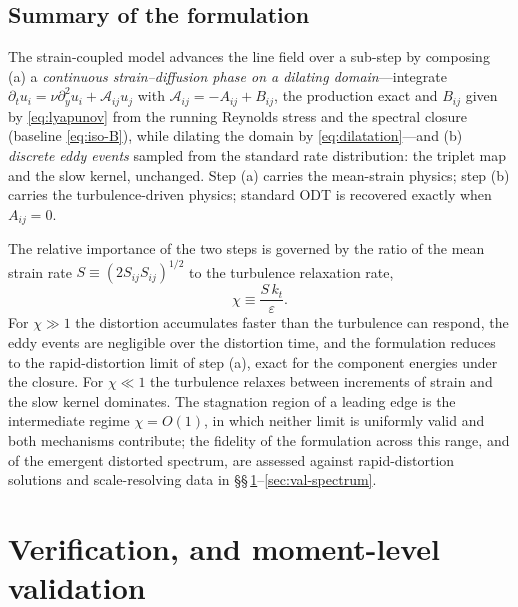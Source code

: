 \documentclass[11pt,a4paper]{article}
\begin{document}
\subsection{Summary of the formulation}\label{sec:summary}

The strain-coupled model advances the line field over a sub-step by
composing (a) a \emph{continuous strain--diffusion phase on a dilating
domain}---integrate
$\partial_t u_i=\nu\partial_y^2u_i+\mathcal{A}_{ij}u_j$ with
$\mathcal{A}_{ij}=-A_{ij}+B_{ij}$, the production exact and $B_{ij}$
given by \eqref{eq:lyapunov} from the running Reynolds stress and the
spectral closure (baseline \eqref{eq:iso-B}), while dilating the domain
by \eqref{eq:dilatation}---and (b) \emph{discrete eddy events} sampled
from the standard rate distribution: the triplet map and the slow kernel,
unchanged. Step (a) carries the mean-strain physics; step (b) carries the
turbulence-driven physics; standard ODT is recovered exactly when
$A_{ij}=0$.

The relative importance of the two steps is governed by the ratio of the
mean strain rate $S\equiv(2S_{ij}S_{ij})^{1/2}$ to the turbulence
relaxation rate,
\begin{equation}
  \chi \equiv \frac{S\,k_t}{\varepsilon}.
  \label{eq:chi}
\end{equation}
For $\chi\gg1$ the distortion accumulates faster than the turbulence can
respond, the eddy events are negligible over the distortion time, and the
formulation reduces to the rapid-distortion limit of step (a), exact for
the component energies under the closure. For $\chi\ll1$ the turbulence
relaxes between increments of strain and the slow kernel dominates. The
stagnation region of a leading edge is the intermediate regime
$\chi=O(1)$, in which neither limit is uniformly valid and both
mechanisms contribute; the fidelity of the formulation across this range,
and of the emergent distorted spectrum, are assessed against
rapid-distortion solutions and scale-resolving data in
\S\S\,\ref{sec:verification}--\ref{sec:val-spectrum}.

\section{Verification, and moment-level validation}\label{sec:verification}
\end{document}
